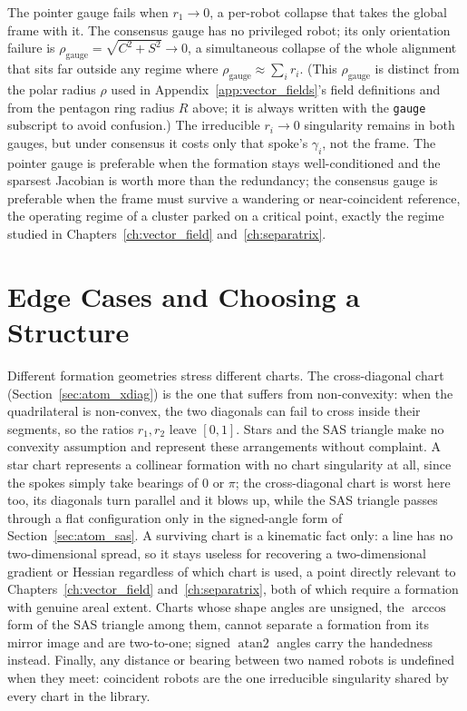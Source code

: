 \documentclass[12pt, letterpaper, oneside]{report}
\begin{document}
The pointer gauge fails when $r_1\to0$, a per-robot collapse that takes the
global frame with it. The consensus gauge has no privileged robot; its only
orientation failure is $\rho_{\text{gauge}}=\sqrt{C^2+S^2}\to0$, a
simultaneous collapse of the whole alignment that sits far outside any
regime where $\rho_{\text{gauge}}\approx\sum_i r_i$. (This
$\rho_{\text{gauge}}$ is distinct from the polar radius $\rho$ used in
Appendix~\ref{app:vector_fields}'s field definitions and from the pentagon
ring radius $R$ above; it is always written with the \texttt{gauge}
subscript to avoid confusion.) The irreducible $r_i\to0$ singularity remains
in both gauges, but under consensus it costs only that spoke's $\gamma_i$,
not the frame. The pointer gauge is preferable when the formation stays
well-conditioned and the sparsest Jacobian is worth more than the
redundancy; the consensus gauge is preferable when the frame must survive a
wandering or near-coincident reference, the operating regime of a cluster
parked on a critical point, exactly the regime studied in
Chapters~\ref{ch:vector_field} and~\ref{ch:separatrix}.

\section{Edge Cases and Choosing a Structure}
\label{sec:edge_cases}

Different formation geometries stress different charts. The cross-diagonal
chart (Section~\ref{sec:atom_xdiag}) is the one that suffers from
non-convexity: when the quadrilateral is non-convex, the two diagonals can
fail to cross inside their segments, so the ratios $r_1,r_2$ leave $[0,1]$.
Stars and the SAS triangle make no convexity assumption and represent these
arrangements without complaint. A star chart represents a collinear
formation with no chart singularity at all, since the spokes simply take
bearings of $0$ or $\pi$; the cross-diagonal chart is worst here too, its
diagonals turn parallel and it blows up, while the SAS triangle passes
through a flat configuration only in the signed-angle form of
Section~\ref{sec:atom_sas}. A surviving chart is a kinematic fact only: a
line has no two-dimensional spread, so it stays useless for recovering a
two-dimensional gradient or Hessian regardless of which chart is used, a
point directly relevant to Chapters~\ref{ch:vector_field}
and~\ref{ch:separatrix}, both of which require a formation with genuine
areal extent. Charts whose shape angles are unsigned, the $\arccos$ form of
the SAS triangle among them, cannot separate a formation from its mirror
image and are two-to-one; signed $\operatorname{atan2}$ angles carry the
handedness instead. Finally, any distance or bearing between two named
robots is undefined when they meet: coincident robots are the one
irreducible singularity shared by every chart in the library.
\end{document}
